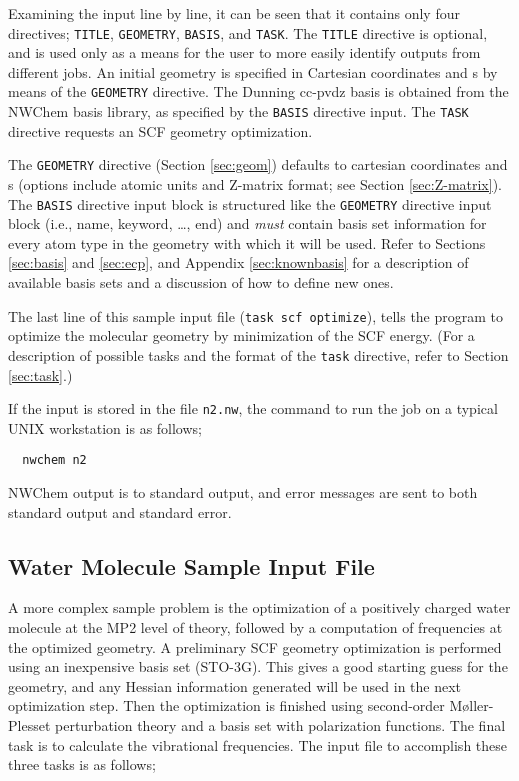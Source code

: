 Examining the input line by line, it can be seen that it contains
only four directives; \verb+TITLE+, \verb+GEOMETRY+, \verb+BASIS+, and
\verb+TASK+.  The \verb+TITLE+ directive is optional, and is used only
as a means for the user to more easily identify outputs from different
jobs.  An initial geometry is specified in Cartesian coordinates and
{\angstrom}s by means of the \verb+GEOMETRY+ directive.  The Dunning 
cc-pvdz basis is obtained from the NWChem basis library, as specified
by the \verb+BASIS+ directive input.  The \verb+TASK+ directive requests 
an SCF geometry optimization.

The \verb+GEOMETRY+ directive (Section \ref{sec:geom}) defaults to cartesian
coordinates and {\angstrom}s (options include atomic units and
Z-matrix format; see Section \ref{sec:Z-matrix}).  The \verb+BASIS+ 
directive input block is structured like the \verb+GEOMETRY+ directive
input block (i.e., name,
keyword, \ldots, end) and {\em must} contain basis set information for
every atom type in the geometry with which it will be used.
Refer to Sections \ref{sec:basis} and \ref{sec:ecp}, and Appendix
\ref{sec:knownbasis} for a description of available basis sets and a
discussion of how to define new ones.

The last line of this sample input file ({\tt task scf optimize}),
tells the program to optimize the molecular geometry by minimization
of the SCF energy.  (For a description of possible tasks and the format
of the {\tt task} directive, refer to Section \ref{sec:task}.)

If the input is stored in the file \verb+n2.nw+, the command to run
the job on a typical UNIX workstation is as follows;

\begin{verbatim}
  nwchem n2
\end{verbatim}

NWChem output is to standard output, and error messages are sent to
both standard output and standard error.

\subsection{Water Molecule Sample Input File}
\label{sec:realsample}

A more complex sample problem is the optimization of a positively
charged water molecule at the MP2 level of theory, followed by a computation of
frequencies at the optimized geometry.  A preliminary SCF geometry
optimization is performed using an inexpensive basis set (STO-3G).
This gives a good starting guess for the geometry, and any Hessian
information generated will be used in the next optimization step.
Then the optimization is finished using second-order M{\o}ller-Plesset
perturbation theory and a basis set with polarization functions.  The
final task is to calculate the vibrational frequencies.  The input
file to accomplish these three tasks is as follows;

